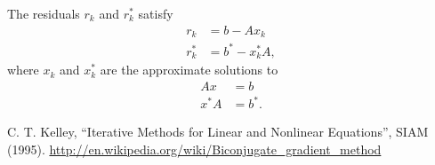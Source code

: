 \documentclass{article}
\begin{document}
The residuals $r_k$ and $r_k^\ast$ satisfy
    \begin{subequations}\begin{align}
    r_k &= b - A x_k \\
    r_k^\ast &= b^\ast - x_k^\ast A,
    \end{align}\end{subequations}
    where $x_k$ and $x_k^\ast$ are the approximate solutions to
    \begin{subequations}\begin{align}
    Ax &= b \\
    x^\ast A &= b^\ast.
    \end{align}\end{subequations}



\begin{thebibliography}{99}
 C. T. Kelley, 
    ``Iterative Methods for Linear and Nonlinear Equations'', 
    SIAM (1995).
 \url{http://en.wikipedia.org/wiki/Biconjugate_gradient_method}
\end{thebibliography}
\end{document}
